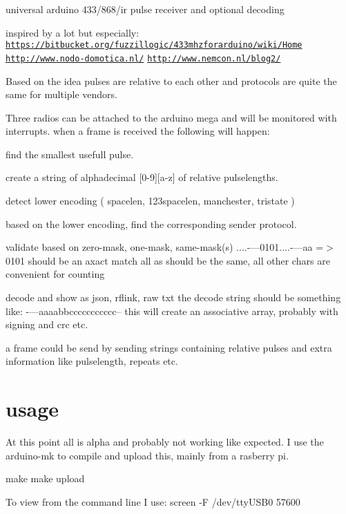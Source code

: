 universal arduino 433/868/ir pulse receiver and optional decoding

inspired by a lot but especially\+: \href{https://bitbucket.org/fuzzillogic/433mhzforarduino/wiki/Home}{\tt https\+://bitbucket.\+org/fuzzillogic/433mhzforarduino/wiki/\+Home} \href{http://www.nodo-domotica.nl/}{\tt http\+://www.\+nodo-\/domotica.\+nl/} \href{http://www.nemcon.nl/blog2/}{\tt http\+://www.\+nemcon.\+nl/blog2/}

Based on the idea pulses are relative to each other and protocols are quite the same for multiple vendors.

Three radios can be attached to the arduino mega and will be monitored with interrupts. when a frame is received the following will happen\+:
\begin{DoxyItemize}
\item find the smallest usefull pulse.
\item create a string of alphadecimal \mbox{[}0-\/9\mbox{]}\mbox{[}a-\/z\mbox{]} of relative pulselengths.
\item detect lower encoding ( spacelen, 123spacelen, manchester, tristate )
\item based on the lower encoding, find the corresponding sender protocol.
\item validate based on zero-\/mask, one-\/mask, same-\/mask(s) ....-\/---0101....-\/---aa =$>$ 0101 should be an axact match all \textquotesingle{}a\textquotesingle{}s should be the same, all other chars are convenient for counting
\item decode and show as json, rflink, raw txt the decode string should be something like\+: -\/---aaaabbccccccccccc-- this will create an associative array, probably with signing and crc etc.
\end{DoxyItemize}

a frame could be send by sending strings containing relative pulses and extra information like pulselength, repeats etc.

\section*{usage }

At this point all is alpha and probably not working like expected. I use the arduino-\/mk to compile and upload this, mainly from a rasberry pi.

make make upload

To view from the command line I use\+: screen -\/F /dev/tty\+U\+S\+B0 57600 